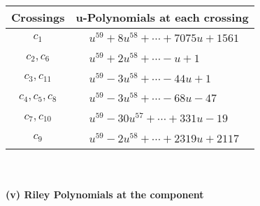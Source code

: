\documentclass[1p]{elsarticle_modified}
\theoremstyle{definition}
\begin{document}
\begin{tabular}{m{50pt}|m{274pt}}
Crossings & \hspace{64pt}u-Polynomials at each crossing \\
\hline $$\begin{aligned}c_{1}\end{aligned}$$&$\begin{aligned}
&u^{59}+8 u^{58}+\cdots+7075 u+1561
\end{aligned}$\\
\hline $$\begin{aligned}c_{2},c_{6}\end{aligned}$$&$\begin{aligned}
&u^{59}+2 u^{58}+\cdots- u+1
\end{aligned}$\\
\hline $$\begin{aligned}c_{3},c_{11}\end{aligned}$$&$\begin{aligned}
&u^{59}-3 u^{58}+\cdots-44 u+1
\end{aligned}$\\
\hline $$\begin{aligned}c_{4},c_{5},c_{8}\end{aligned}$$&$\begin{aligned}
&u^{59}-3 u^{58}+\cdots-68 u-47
\end{aligned}$\\
\hline $$\begin{aligned}c_{7},c_{10}\end{aligned}$$&$\begin{aligned}
&u^{59}-30 u^{57}+\cdots+331 u-19
\end{aligned}$\\
\hline $$\begin{aligned}c_{9}\end{aligned}$$&$\begin{aligned}
&u^{59}-2 u^{58}+\cdots+2319 u+2117
\end{aligned}$\\
\hline
\end{tabular}\\~\\
\newpage\renewcommand{\arraystretch}{1}
\flushleft \textbf{(v) Riley Polynomials at the component}\newline \\
\end{document}
